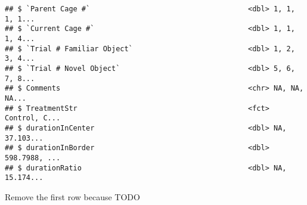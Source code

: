 \documentclass[]{article}
\newenvironment{Shaded}{\begin{snugshade}}{\end{snugshade}}
\newcommand{\KeywordTok}[1]{\textcolor[rgb]{0.13,0.29,0.53}{\textbf{#1}}}
\newcommand{\DecValTok}[1]{\textcolor[rgb]{0.00,0.00,0.81}{#1}}
\newcommand{\StringTok}[1]{\textcolor[rgb]{0.31,0.60,0.02}{#1}}
\newcommand{\CommentTok}[1]{\textcolor[rgb]{0.56,0.35,0.01}{\textit{#1}}}
\newcommand{\OperatorTok}[1]{\textcolor[rgb]{0.81,0.36,0.00}{\textbf{#1}}}
\newcommand{\NormalTok}[1]{#1}
\begin{document}
\begin{verbatim}
## $ `Parent Cage #`                                     <dbl> 1, 1, 1, 1...
## $ `Current Cage #`                                    <dbl> 1, 1, 1, 4...
## $ `Trial # Familiar Object`                           <dbl> 1, 2, 3, 4...
## $ `Trial # Novel Object`                              <dbl> 5, 6, 7, 8...
## $ Comments                                            <chr> NA, NA, NA...
## $ TreatmentStr                                        <fct> Control, C...
## $ durationInCenter                                    <dbl> NA, 37.103...
## $ durationInBorder                                    <dbl> 598.7988, ...
## $ durationRatio                                       <dbl> NA, 15.174...
\end{verbatim}

Remove the first row because TODO

\begin{Shaded}
\end{Shaded}
\end{document}
